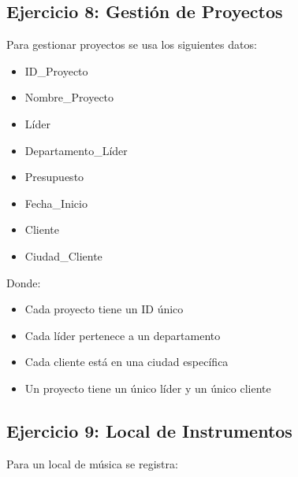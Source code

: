 \documentclass[12pt]{article}
\begin{document}
\subsection{Ejercicio 8: Gestión de Proyectos}
Para gestionar proyectos se usa los siguientes datos:

\vspace{0.5em}

\begin{minipage}[t]{0.48\textwidth}
\begin{itemize}
    \item ID\_Proyecto
    \item Nombre\_Proyecto
    \item Líder
    \item Departamento\_Líder
\end{itemize}
\end{minipage}
\hfill
\begin{minipage}[t]{0.48\textwidth}
\begin{itemize}
    \item Presupuesto
    \item Fecha\_Inicio
    \item Cliente
    \item Ciudad\_Cliente
\end{itemize}
\end{minipage}

\vspace{1em}

Donde:
\begin{itemize}
    \item Cada proyecto tiene un ID único
    \item Cada líder pertenece a un departamento
    \item Cada cliente está en una ciudad específica
    \item Un proyecto tiene un único líder y un único cliente
\end{itemize}

\subsection{Ejercicio 9: Local de Instrumentos}
Para un local de música se registra:

\vspace{0.5em}
\end{document}
